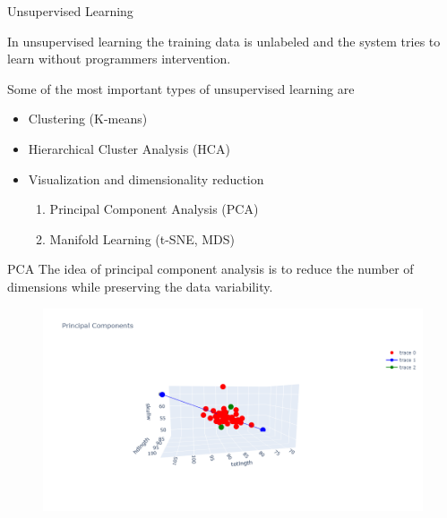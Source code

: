 \documentclass{beamer}
\begin{document}
\begin{frame}{Unsupervised Learning}	

	In unsupervised learning the training data is unlabeled and the system tries to learn without programmers intervention.
	
	Some of the most important types of unsupervised learning are
	\begin{itemize}
		\item Clustering (K-means)
		\item	Hierarchical Cluster Analysis (HCA)
		\item Visualization and dimensionality reduction
		\begin{enumerate}
			\item 	Principal Component Analysis (PCA)
			\item  Manifold Learning (t-SNE, MDS)
		\end{enumerate}

	\end{itemize}

\end{frame}

\begin{frame}{PCA}
The idea of principal component analysis is to reduce the number of dimensions while preserving the data variability. 
	\begin{figure}[h]
	\centering
	\includegraphics[scale=0.35]{Figures/3d_2pc.png}
\end{figure}			

\end{frame}
\end{document}
